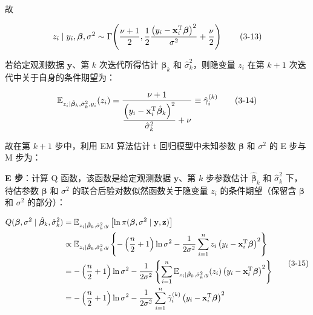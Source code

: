 \documentclass[12pt,a4paper]{ctexart}
\makeatletter
\numberwithin{figure}{section}
\numberwithin{table}{section}
\let\ltx@orig@tag\tag
\renewcommand{\tag}[1]{\refstepcounter{equation}\ltx@orig@tag{#1}}%
\makeatother
\begin{document}
故

\begin{equation}
z_i \mid y_i, \boldsymbol{\beta}, \sigma^2 \sim \Gamma\!\left(\frac{\nu+1}{2}, \frac{1}{2}\frac{\left(y_i - \mathbf{x}_i^{\mathrm{T}} \boldsymbol{\beta}\right)^2}{\sigma^2} + \frac{\nu}{2}\right) \tag{3-13}
\end{equation}

若给定观测数据 $\mathbf{y}$、第 $k$ 次迭代所得估计 $\hat{\boldsymbol{\beta}}_k$ 和 $\hat{\sigma}_k^2$，则隐变量 $z_i$ 在第 $k+1$ 次迭代中关于自身的条件期望为：

\begin{equation}
\mathbb{E}_{z_i \mid \hat{\boldsymbol{\beta}}_k, \hat{\sigma}_k^2, y_i}(z_i) = \frac{\nu+1}{\dfrac{\left(y_i - \mathbf{x}_i^{\mathrm{T}} \hat{\boldsymbol{\beta}}_k\right)^2}{\hat{\sigma}_k^2} + \nu} \equiv \hat{\gamma}_i^{(k)} \tag{3-14}
\end{equation}

故在第 $k+1$ 步中，利用 EM 算法估计 t 回归模型中未知参数 $\boldsymbol{\beta}$ 和 $\sigma^2$ 的 E 步与 M 步为：

\textbf{E 步}：计算 Q 函数，该函数是给定观测数据 $\mathbf{y}$、第 $k$ 步参数估计 $\hat{\boldsymbol{\beta}}_k$ 和 $\hat{\sigma}_k^2$ 下，待估参数 $\boldsymbol{\beta}$ 和 $\sigma^2$ 的联合后验对数似然函数关于隐变量 $z_i$ 的条件期望（保留含 $\boldsymbol{\beta}$ 和 $\sigma^2$ 的部分）：

\begin{equation}
\begin{aligned}
Q(\boldsymbol{\beta}, \sigma^2 \mid \hat{\boldsymbol{\beta}}_k, \hat{\sigma}_k^2) &= \mathbb{E}_{z_i \mid \hat{\boldsymbol{\beta}}_k, \hat{\sigma}_k^2, y}\left[\ln \pi(\boldsymbol{\beta}, \sigma^2 \mid \mathbf{y}, \mathbf{z})\right] \\
&\propto \mathbb{E}_{z_i \mid \hat{\boldsymbol{\beta}}_k, \hat{\sigma}_k^2, y}\left\{-\left(\frac{n}{2}+1\right)\ln \sigma^2 - \frac{1}{2\sigma^2}\sum_{i=1}^{n} z_i\left(y_i - \mathbf{x}_i^{\mathrm{T}} \boldsymbol{\beta}\right)^2\right\} \\
&= -\left(\frac{n}{2}+1\right)\ln \sigma^2 - \frac{1}{2\sigma^2}\left\{\sum_{i=1}^{n} \mathbb{E}_{z_i \mid \hat{\boldsymbol{\beta}}_k, \hat{\sigma}_k^2, y}(z_i)\left(y_i - \mathbf{x}_i^{\mathrm{T}} \boldsymbol{\beta}\right)^2\right\} \\
&= -\left(\frac{n}{2}+1\right)\ln \sigma^2 - \frac{1}{2\sigma^2}\sum_{i=1}^{n} \hat{\gamma}_i^{(k)}\left(y_i - \mathbf{x}_i^{\mathrm{T}} \boldsymbol{\beta}\right)^2
\end{aligned} \tag{3-15}
\end{equation}
\end{document}
